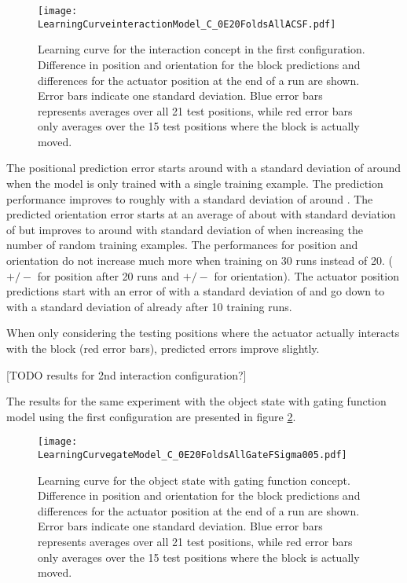 \begin{figure}[h]
\centering
\texttt{[image: LearningCurveinteractionModel\_C\_0E20FoldsAllACSF.pdf]}
\caption{Learning curve for the interaction concept in the first configuration. Difference in position and orientation for the block predictions and differences for the actuator position at the end of a run are shown. Error bars indicate one standard deviation. Blue error bars represents averages over all 21 test positions, while red error bars only averages over the 15 test positions where the block is actually moved.}
\label{fig:learnCurveInteraction1}
\end{figure}

The positional prediction error starts around  with a standard deviation of around  when the model is only trained with a single training example. The prediction performance improves to roughly  with a standard deviation of around .
The predicted orientation error starts at an average of about  with standard deviation of  but improves to around  with standard deviation of  when increasing the number of random training examples.
The performances for position and orientation do not increase much more when training on 30 runs instead of 20. ( $+/-$  for position after 20 runs and  $+/-$  for orientation).
The actuator position predictions start with an error of  with a standard deviation of  and go down to  with a standard deviation of  already after 10 training runs.

When only considering the testing positions where the actuator actually interacts with the block (red error bars), predicted errors improve slightly.

[TODO results for 2nd interaction configuration?]

The results for the same experiment with the object state with gating function model using the first configuration are presented in figure \ref{fig:learnCurveGate1}.

\begin{figure}[h]
\centering
\texttt{[image: LearningCurvegateModel\_C\_0E20FoldsAllGateFSigma005.pdf]}
\caption{Learning curve for the object state with gating function concept. Difference in position and orientation for the block predictions and differences for the actuator position at the end of a run are shown. Error bars indicate one standard deviation. Blue error bars represents averages over all 21 test positions, while red error bars only averages over the 15 test positions where the block is actually moved.}
\label{fig:learnCurveGate1}
\end{figure}

